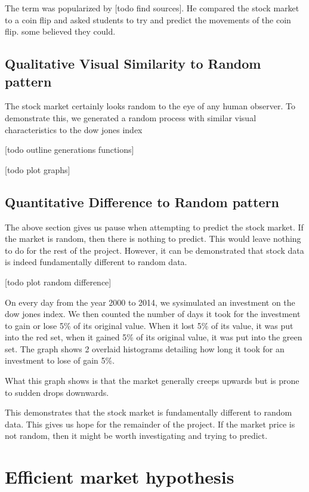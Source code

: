 \documentclass{report}
\begin{document}
The term was popularized by [todo find sources]. He compared the stock market to a coin flip and asked students to try and predict the movements of the coin flip. some believed they could.

\subsection{Qualitative Visual Similarity to Random pattern}

The stock market certainly looks random to the eye of any human observer. To demonstrate this, we generated a random process with similar visual characteristics to the dow jones index

[todo outline generations functions]

[todo plot graphs]

\subsection{Quantitative Difference to Random pattern}

The above section gives us pause when attempting to predict the stock market. If the market is random, then there is nothing to predict. This would leave nothing to do for the rest of the project. However, it can be demonstrated that stock data is indeed fundamentally different to random data.

[todo plot random difference]

On every day from the year 2000 to 2014, we sysimulated an investment on the dow jones index. We then counted the number of days it took for the investment to gain or lose 5\% of its original value. When it lost 5\% of its value, it was put into the red set, when it gained 5\% of its original value, it was put into the green set. The graph shows 2 overlaid histograms detailing how long it took for an investment to lose of gain 5\%.

What this graph shows is that the market generally creeps upwards but is prone to sudden drops downwards.

This demonstrates that the stock market is fundamentally different to random data. This gives us hope for the remainder of the project. If the market price is not random, then it might be worth investigating and trying to predict.

\section{Efficient market hypothesis}
\end{document}
